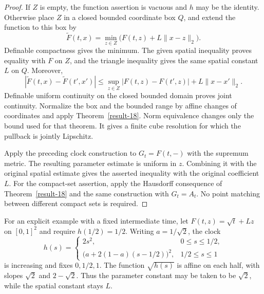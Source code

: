 \begin{proof}
If $Z$ is empty, the function assertion is vacuous and $h$ may be
the identity.  Otherwise place $Z$ in a closed bounded coordinate
box $Q$, and extend the function to this box by
\[
 \widetilde F(t,x)=
 \min_{z\in Z}\bigl(F(t,z)+L\|x-z\|_2\bigr).
\]
Definable compactness gives the minimum.  The given spatial
inequality proves equality with $F$ on $Z$, and the triangle
inequality gives the same spatial constant $L$ on $Q$.  Moreover,
\[
 |\widetilde F(t,x)-\widetilde F(t',x')|
 \le \sup_{z\in Z}|F(t,z)-F(t',z)|+L\|x-x'\|_2.
\]
Definable uniform continuity on the closed bounded domain proves
joint continuity.  Normalize the box and the bounded range by
affine changes of coordinates and apply Theorem~\ref{result-18}.
Norm equivalence changes only the bound used for that theorem.
It gives a finite cube resolution for which the pullback is
jointly Lipschitz.

Apply the preceding clock construction to $G_t=F(t,-)$ with the
supremum metric.  The resulting parameter estimate is uniform
in $z$.  Combining it with the original spatial estimate gives
the asserted inequality with the original coefficient $L$.
For the compact-set assertion, apply the Hausdorff consequence of
Theorem~\ref{result-18} and the same construction with $G_t=A_t$.
No point matching between different compact sets is required.
\end{proof}

For an explicit example with a fixed intermediate time, let
$F(t,z)=\sqrt t+Lz$ on $[0,1]^2$ and require $h(1/2)=1/2$.
Writing $a=1/\sqrt2$, the clock
\[
 h(s)=
 \begin{cases}
  2s^2,&0\le s\le1/2,\\
  \bigl(a+2(1-a)(s-1/2)\bigr)^2,&1/2\le s\le1
 \end{cases}
\]
is increasing and fixes $0,1/2,1$.  The function $\sqrt{h(s)}$
is affine on each half, with slopes $\sqrt2$ and $2-\sqrt2$.
Thus the parameter constant may be taken to be $\sqrt2$, while
the spatial constant stays $L$.

